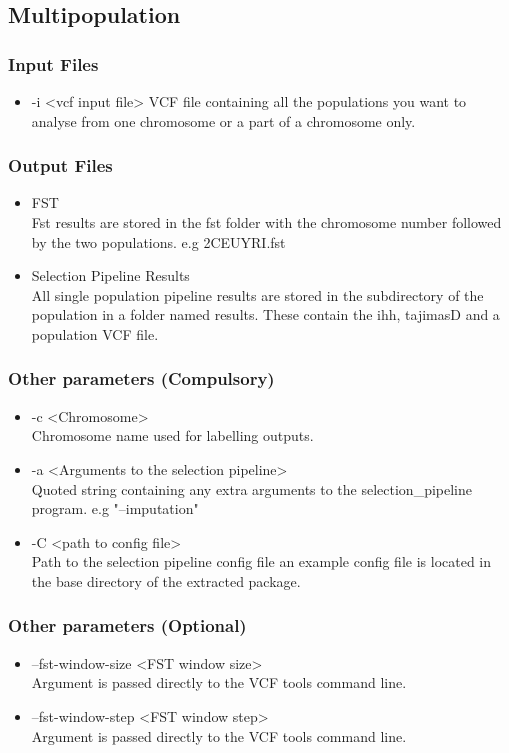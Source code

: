 \documentclass[a4paper,10pt]{article}
\begin{document}
\subsection{Multipopulation}
\subsubsection{Input Files}
\begin{itemize}
\item -i <vcf input file>
VCF file containing all the populations you want to analyse from one chromosome or a part of a chromosome only. 
\end{itemize}
\subsubsection{Output Files}
\begin{itemize}
\item FST \\
Fst results are stored in the fst folder with the chromosome number followed by the two populations. e.g 2CEUYRI.fst
\item Selection Pipeline Results\\
All single population pipeline results are stored in the subdirectory of the population in a folder named results. These contain the ihh, tajimasD and a population VCF file.
\end{itemize}
\subsubsection{Other parameters (Compulsory)}
\begin{itemize}
\item -c <Chromosome>\\
Chromosome name used for labelling outputs.
\item -a <Arguments to the selection pipeline>\\
Quoted string containing any extra arguments to the selection\_pipeline program. e.g "--imputation"
\item -C <path to config file>\\
Path to the selection pipeline config file an example config file is located in the base directory of the extracted package.
\end{itemize}
\subsubsection{Other parameters (Optional)}
\begin{itemize}
\item --fst-window-size <FST window size>\\
Argument is passed directly to the VCF tools command line.
\item --fst-window-step <FST window step>\\
Argument is passed directly to the VCF tools command line.
\end{itemize}
\end{document}
